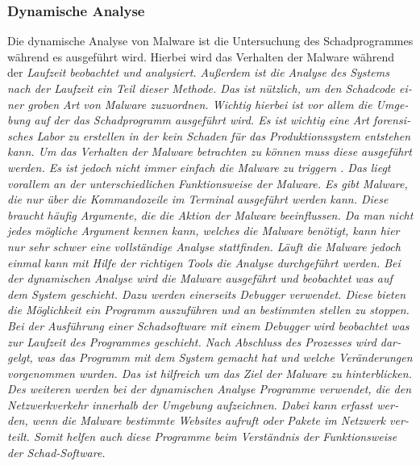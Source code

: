 \begin{otherlanguage}{ngerman}
\subsubsection{Dynamische Analyse}
Die dynamische Analyse von Malware ist die Untersuchung des Schadprogrammes während es ausgeführt wird. Hierbei wird das Verhalten der Malware während der \it Laufzeit \rm beobachtet und analysiert. Außerdem ist die Analyse des Systems nach der Laufzeit ein Teil dieser Methode. Das ist nützlich, um den Schadcode einer groben Art von Malware zuzuordnen. Wichtig hierbei ist vor allem die Umgebung auf der das Schadprogramm ausgeführt wird. Es ist wichtig eine Art \it forensisches Labor \rm zu erstellen in der kein Schaden für das Produktionssystem entstehen kann. 
\newline
Um das Verhalten der Malware betrachten zu können muss diese ausgeführt werden. Es ist jedoch nicht immer einfach die Malware zu \it triggern \rm. Das liegt vorallem an der unterschiedlichen Funktionsweise der Malware. Es gibt Malware, die nur über die Kommandozeile im Terminal ausgeführt werden kann. Diese braucht häufig Argumente, die die Aktion der Malware beeinflussen. Da man nicht jedes mögliche Argument kennen kann, welches die Malware benötigt, kann hier nur sehr schwer eine vollständige Analyse stattfinden. 
\newline
Läuft die Malware jedoch einmal kann mit Hilfe der richtigen Tools die Analyse durchgeführt werden. Bei der dynamischen Analyse wird die Malware ausgeführt und beobachtet was auf dem System geschieht. Dazu werden einerseits \it Debugger \rm verwendet. Diese bieten die Möglichkeit ein Programm auszuführen und an bestimmten stellen zu stoppen. Bei der Ausführung einer Schadsoftware mit einem Debugger wird beobachtet was zur Laufzeit des Programmes geschieht. Nach Abschluss des Prozesses wird dargelgt, was das Programm mit dem System gemacht hat und welche Veränderungen vorgenommen wurden. Das ist hilfreich um das Ziel der Malware zu hinterblicken. \newline 
Des weiteren werden bei der dynamischen Analyse Programme verwendet, die den Netzwerkverkehr innerhalb der Umgebung aufzeichnen. Dabei kann erfasst werden, wenn die Malware bestimmte Websites aufruft oder Pakete im Netzwerk verteilt. Somit helfen auch diese Programme beim Verständnis der Funktionsweise der Schad-Software.


\end{otherlanguage}